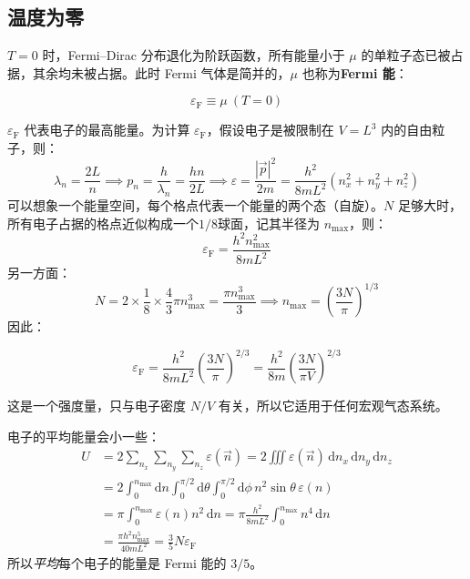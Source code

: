 \subsection{温度为零}
$T=0$ 时，Fermi--Dirac 分布退化为阶跃函数，所有能量小于 $\mu$ 的单粒子态已被占据，其余均未被占据。此时 Fermi 气体是简并的，$\mu$ 也称为\textbf{Fermi 能}：
\begin{definition}[Fermi 能]
    \begin{equation}
        \varepsilon_\mathrm{F}\equiv \mu\ (T=0)
    \end{equation}
\end{definition}

$\varepsilon_\mathrm{F}$ 代表电子的最高能量。为计算 $\varepsilon_\mathrm{F}$，假设电子是被限制在 $V=L^3$ 内的自由粒子，则：
\begin{equation}
    \lambda_n=\frac{2L}{n} \implies
    p_n=\frac{h}{\lambda_n}=\frac{hn}{2L}
    \implies
    \varepsilon=\frac{|\vec{p}|^2}{2m}=\frac{h^2}{8mL^2}(n_x^2+n_y^2+n_z^2)
\end{equation}
可以想象一个能量空间，每个格点代表一个能量的两个态（自旋）。$N$ 足够大时，所有电子占据的格点近似构成一个$1/8$球面，记其半径为 $n_{\max}$，则：
\begin{equation}
    \varepsilon_\mathrm{F}=\frac{h^2n_{\max}^2}{8mL^2}
\end{equation}
另一方面：
\begin{equation}
    N=2\times\frac{1}{8}\times\frac{4}{3}\pi n_{\max}^3=\frac{\pi n_{\max}^3}{3}
    \implies
    n_{\max}=\left(\frac{3N}{\pi}\right)^{1/3}
\end{equation}
因此：
\begin{corollary}
    \begin{equation}
        \varepsilon_\mathrm{F}
        =\frac{h^2}{8mL^2}\left(\frac{3N}{\pi}\right)^{2/3}
        =\frac{h^2}{8m}\left(\frac{3N}{\pi V}\right)^{2/3}
    \end{equation}
\end{corollary}
这是一个强度量，只与电子密度 $N/V$ 有关，所以它适用于任何宏观气态系统。

电子的平均能量会小一些：
\begin{equation}\label{eq:fermiE}
    \begin{split}
        U
        &=2\sum_{n_x}\sum_{n_y}\sum_{n_z}\varepsilon(\vec n)
        =2\iiint \varepsilon(\vec n)\,\mathrm{d}n_x\,\mathrm{d}n_y\,\mathrm{d}n_z\\
        &=2\int_0^{n_{\max}}\mathrm{d}n\int_0^{\pi/2}\mathrm{d}\theta\int_0^{\pi/2}\mathrm{d}\phi\,n^2\sin\theta \, \varepsilon(n)\\
        &=\pi\int_0^{n_{\max}}\varepsilon(n)n^2\,\mathrm{d}n
        =\pi\frac{h^2}{8mL^2}\int_0^{n_{\max}}n^4\,\mathrm{d}n\\
        &=\frac{\pi h^2n_{\max}^5}{40mL^2}
        =\frac{3}{5}N\varepsilon_\mathrm{F}
    \end{split}
\end{equation}
所以\textit{平均}每个电子的能量是 Fermi 能的 $3/5$。

